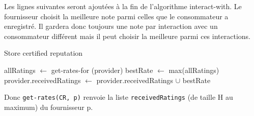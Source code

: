 Les lignes suivantes seront ajoutées à la fin de l'algorithme interact-with. Le fournisseur choisit la meilleure note parmi celles que le consommateur a enregistré. Il gardera donc toujours une note par interaction avec un consommateur différent mais il peut choisir la meilleure parmi ces interactions.
\begin{algorithm}[H]
\caption{Store certified reputation}

\begin{algorithmic}
\STATE allRatings $\leftarrow$ get-rates-for (provider)
\STATE bestRate $\leftarrow$ max(allRatings)
\STATE provider.receivedRatings $\leftarrow$ provider.receivedRatings $\cup$ bestRate

\end{algorithmic}
\end{algorithm}

Donc \texttt{get-rates(CR, p)} renvoie la liste \texttt{receivedRatings} (de taille H au maximum) du fournisseur p.